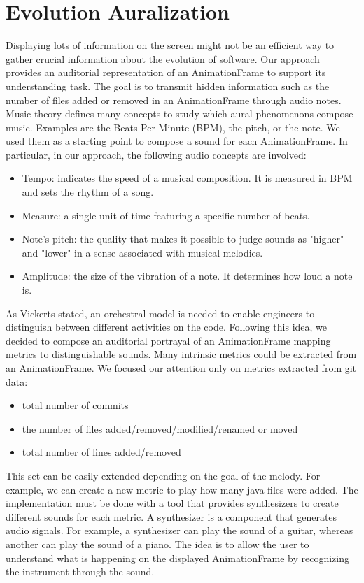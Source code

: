 \section{Evolution Auralization}
\label{sec:audioApproach}
Displaying lots of information on the screen might not be an efficient way to gather crucial information about the evolution of software. Our approach provides an auditorial representation of an AnimationFrame to support its understanding task. The goal is to transmit hidden information such as the number of files added or removed in an AnimationFrame through audio notes. 
\bigbreak
Music theory defines many concepts to study which aural phenomenons compose music. Examples are the Beats Per Minute (BPM), the pitch, or the note. We used them as a starting point to compose a sound for each AnimationFrame. In particular, in our approach, the following audio concepts are involved:
\begin{itemize}
    \item Tempo: indicates the speed of a musical composition. It is measured in BPM and sets the rhythm of a song. 
    \item Measure: a single unit of time featuring a specific number of beats. 
	\item Note's pitch: the quality that makes it possible to judge sounds as "higher" and "lower" in a sense associated with musical melodies.
	\item Amplitude: the size of the vibration of a note. It determines how loud a note is.
\end{itemize}
\bigbreak
As Vickerts \cite{Vickers2004} stated, an orchestral model is needed to enable engineers to distinguish between different activities on the code. Following this idea, we decided to compose an auditorial portrayal of an  AnimationFrame mapping metrics to distinguishable sounds. Many intrinsic metrics could be extracted from an AnimationFrame. We focused our attention only on metrics extracted from git data:
\begin{itemize}
    \item total number of commits
    \item the number of files added/removed/modified/renamed or moved
    \item total number of lines added/removed
\end{itemize}
This set can be easily extended depending on the goal of the melody. For example, we can create a new metric to play how many java files were added. The implementation must be done with a tool that provides synthesizers to create different sounds for each metric. A synthesizer is a component that generates audio signals. For example, a synthesizer can play the sound of a guitar, whereas another can play the sound of a piano. The idea is to allow the user to understand what is happening on the displayed AnimationFrame by recognizing the instrument through the sound. 
